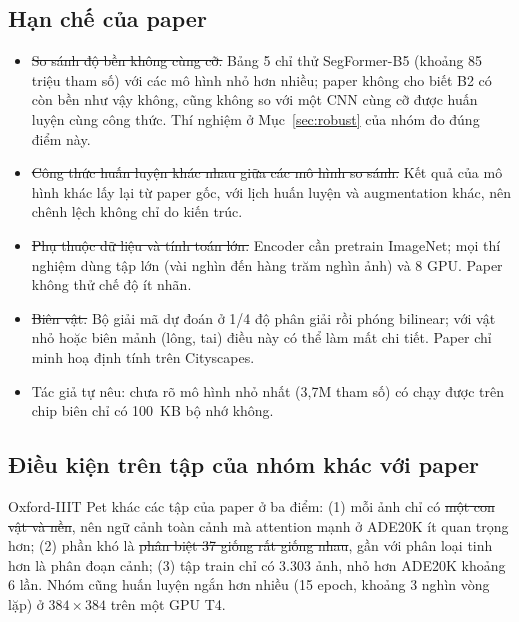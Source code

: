 \subsection{Hạn chế của paper}
\begin{itemize}
  \item \st{So sánh độ bền không cùng cỡ.} Bảng 5 chỉ thử SegFormer-B5 (khoảng 85 triệu tham số) với các mô hình nhỏ hơn
        nhiều; paper không cho biết B2 có còn bền như vậy không, cũng không so với một CNN cùng cỡ được huấn luyện cùng
        công thức. Thí nghiệm ở Mục~\ref{sec:robust} của nhóm đo đúng điểm này.
  \item \st{Công thức huấn luyện khác nhau giữa các mô hình so sánh.} Kết quả của mô hình khác lấy lại từ paper gốc, với
        lịch huấn luyện và augmentation khác, nên chênh lệch không chỉ do kiến trúc.
  \item \st{Phụ thuộc dữ liệu và tính toán lớn.} Encoder cần pretrain ImageNet; mọi thí nghiệm dùng tập lớn (vài nghìn đến
        hàng trăm nghìn ảnh) và 8 GPU. Paper không thử chế độ ít nhãn.
  \item \st{Biên vật.} Bộ giải mã dự đoán ở 1/4 độ phân giải rồi phóng bilinear; với vật nhỏ hoặc biên mảnh (lông, tai) điều
        này có thể làm mất chi tiết. Paper chỉ minh hoạ định tính trên Cityscapes.
  \item Tác giả tự nêu: chưa rõ mô hình nhỏ nhất (3,7M tham số) có chạy được trên chip biên chỉ có 100~KB bộ nhớ không.
\end{itemize}

\subsection{Điều kiện trên tập của nhóm khác với paper}
Oxford-IIIT Pet khác các tập của paper ở ba điểm: (1) mỗi ảnh chỉ có \st{một con vật và nền}, nên ngữ cảnh toàn cảnh mà
attention mạnh ở ADE20K ít quan trọng hơn; (2) phần khó là \st{phân biệt 37 giống rất giống nhau}, gần với phân loại tinh
hơn là phân đoạn cảnh; (3) tập train chỉ có 3.303 ảnh, nhỏ hơn ADE20K khoảng 6 lần. Nhóm cũng huấn luyện ngắn hơn nhiều
(15 epoch, khoảng 3 nghìn vòng lặp) ở $384\times384$ trên một GPU T4.
